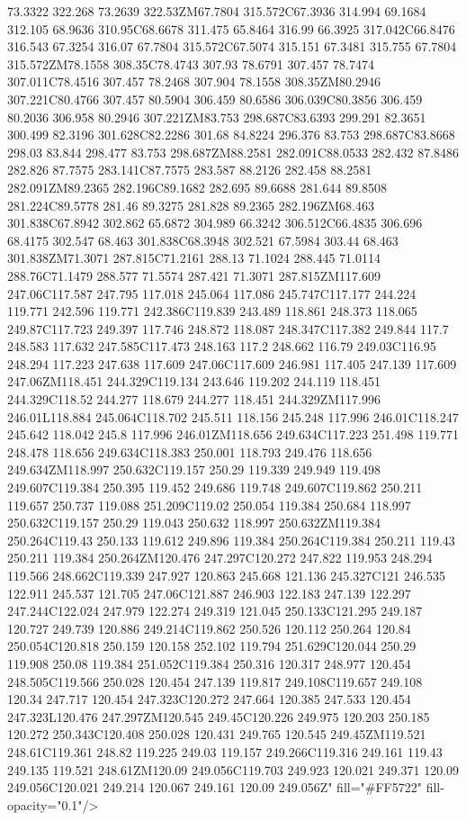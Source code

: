 73.3322 322.268 73.2639 322.53ZM67.7804 315.572C67.3936 314.994 69.1684 312.105 68.9636 310.95C68.6678 311.475 65.8464 316.99 66.3925 317.042C66.8476 316.543 67.3254 316.07 67.7804 315.572C67.5074 315.151 67.3481 315.755 67.7804 315.572ZM78.1558 308.35C78.4743 307.93 78.6791 307.457 78.7474 307.011C78.4516 307.457 78.2468 307.904 78.1558 308.35ZM80.2946 307.221C80.4766 307.457 80.5904 306.459 80.6586 306.039C80.3856 306.459 80.2036 306.958 80.2946 307.221ZM83.753 298.687C83.6393 299.291 82.3651 300.499 82.3196 301.628C82.2286 301.68 84.8224 296.376 83.753 298.687C83.8668 298.03 83.844 298.477 83.753 298.687ZM88.2581 282.091C88.0533 282.432 87.8486 282.826 87.7575 283.141C87.7575 283.587 88.2126 282.458 88.2581 282.091ZM89.2365 282.196C89.1682 282.695 89.6688 281.644 89.8508 281.224C89.5778 281.46 89.3275 281.828 89.2365 282.196ZM68.463 301.838C67.8942 302.862 65.6872 304.989 66.3242 306.512C66.4835 306.696 68.4175 302.547 68.463 301.838C68.3948 302.521 67.5984 303.44 68.463 301.838ZM71.3071 287.815C71.2161 288.13 71.1024 288.445 71.0114 288.76C71.1479 288.577 71.5574 287.421 71.3071 287.815ZM117.609 247.06C117.587 247.795 117.018 245.064 117.086 245.747C117.177 244.224 119.771 242.596 119.771 242.386C119.839 243.489 118.861 248.373 118.065 249.87C117.723 249.397 117.746 248.872 118.087 248.347C117.382 249.844 117.7 248.583 117.632 247.585C117.473 248.163 117.2 248.662 116.79 249.03C116.95 248.294 117.223 247.638 117.609 247.06C117.609 246.981 117.405 247.139 117.609 247.06ZM118.451 244.329C119.134 243.646 119.202 244.119 118.451 244.329C118.52 244.277 118.679 244.277 118.451 244.329ZM117.996 246.01L118.884 245.064C118.702 245.511 118.156 245.248 117.996 246.01C118.247 245.642 118.042 245.8 117.996 246.01ZM118.656 249.634C117.223 251.498 119.771 248.478 118.656 249.634C118.383 250.001 118.793 249.476 118.656 249.634ZM118.997 250.632C119.157 250.29 119.339 249.949 119.498 249.607C119.384 250.395 119.452 249.686 119.748 249.607C119.862 250.211 119.657 250.737 119.088 251.209C119.02 250.054 119.384 250.684 118.997 250.632C119.157 250.29 119.043 250.632 118.997 250.632ZM119.384 250.264C119.43 250.133 119.612 249.896 119.384 250.264C119.384 250.211 119.43 250.211 119.384 250.264ZM120.476 247.297C120.272 247.822 119.953 248.294 119.566 248.662C119.339 247.927 120.863 245.668 121.136 245.327C121 246.535 122.911 245.537 121.705 247.06C121.887 246.903 122.183 247.139 122.297 247.244C122.024 247.979 122.274 249.319 121.045 250.133C121.295 249.187 120.727 249.739 120.886 249.214C119.862 250.526 120.112 250.264 120.84 250.054C120.818 250.159 120.158 252.102 119.794 251.629C120.044 250.29 119.908 250.08 119.384 251.052C119.384 250.316 120.317 248.977 120.454 248.505C119.566 250.028 120.454 247.139 119.817 249.108C119.657 249.108 120.34 247.717 120.454 247.323C120.272 247.664 120.385 247.533 120.454 247.323L120.476 247.297ZM120.545 249.45C120.226 249.975 120.203 250.185 120.272 250.343C120.408 250.028 120.431 249.765 120.545 249.45ZM119.521 248.61C119.361 248.82 119.225 249.03 119.157 249.266C119.316 249.161 119.43 249.135 119.521 248.61ZM120.09 249.056C119.703 249.923 120.021 249.371 120.09 249.056C120.021 249.214 120.067 249.161 120.09 249.056Z" fill="#FF5722" fill-opacity="0.1"/>
